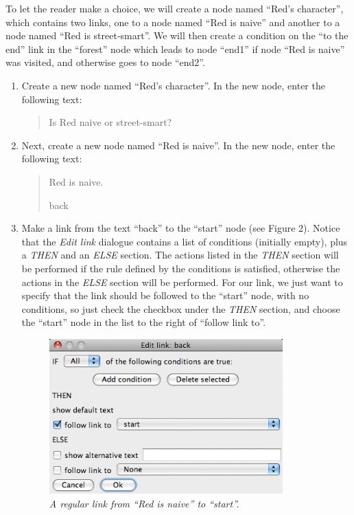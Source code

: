 \documentclass{article}
\begin{document}
To let the reader make a choice, we will create a node named ``Red's
character'', which contains two links, one to a node named ``Red is naive'' and
another to a node named ``Red is street-smart''. We will then create a
condition on the ``to the end'' link in the ``forest'' node which leads
to node ``end1'' if node ``Red is naive'' was visited, and otherwise goes to
node ``end2''.

\begin{enumerate}
  \item Create a new node named ``Red's character''. In the new node, enter the
following text:

\begin{quotation}
Is Red naive or street-smart?
\end{quotation}

\item Next, create a new node named ``Red is naive''. In the new node, enter the
following text:

\begin{quotation}
Red is naive.

back
\end{quotation}

\item Make a link from the text ``back'' to the ``start'' node (see Figure 2).
Notice that the \textit{Edit link} dialogue contains a list of conditions
(initially empty), plus a \textit{THEN} and an \textit{ELSE} section. The
actions listed in the \textit{THEN} section will be performed if the rule
defined by the conditions is satisfied, otherwise the actions in the
\textit{ELSE} section will be performed. For our link, we just want to specify
that the link should be followed to the ``start'' node, with no conditions, so
just check the checkbox under the \textit{THEN} section, and choose the
``start'' node in the list to the right of ``follow link to''.

\begin{figure}[h]
  \centering
  \includegraphics[width=9cm]{images/hypedyn-tutorial-2-figure-2}
  \caption{\textit{A regular link from ``Red is naive'' to ``start''.}}
\end{figure} 


\end{enumerate}
\end{document}
